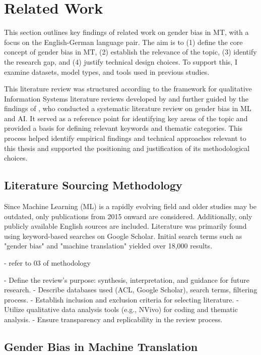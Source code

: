 \chapter{Related Work}

This section outlines key findings of related work on gender bias in MT, with a focus on the English-German language pair. The aim is to (1) define the core concept of gender bias in MT, (2) establish the relevance of the topic, (3) identify the research gap, and (4) justify technical design choices. To support this, I examine datasets, model types, and tools used in previous studies.

This literature review was structured according to the framework for qualitative Information Systems literature reviews developed by \citet{smacchiaDoesAIReflect2024} and further guided by the findings of \citet{shresthaExploringGenderBiases2022}, who conducted a systematic literature review on gender bias in ML and AI. It served as a reference point for identifying key areas of the topic and provided a basis for defining relevant keywords and thematic categories. This process helped identify empirical findings and technical approaches relevant to this thesis and supported the positioning and justification of its methodological choices.


\section{Literature Sourcing Methodology}



Since Machine Learning (ML) is a rapidly evolving field and older studies may be outdated, only
publications from 2015 onward are considered. Additionally, only publicly available English sources
are included. Literature was primarily found using keyword-based searches on Google Scholar. Initial
search terms such as "gender bias" and "machine translation" yielded over 18,000 results. 


- refer to 03 of methodology

- Define the review's purpose: synthesis, interpretation, and guidance for future research.
- Describe databases used (ACL, Google Scholar), search terms, filtering process.
- Establish inclusion and exclusion criteria for selecting literature.
- Utilize qualitative data analysis tools (e.g., NVivo) for coding and thematic analysis.
- Ensure transparency and replicability in the review process.

\section{Gender Bias in Machine Translation}

